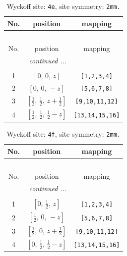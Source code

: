 \documentclass[fleqn,8pt]{jsarticle}
\begin{document}
\begin{longtable}{ccc}
\caption{Wyckoff site: {\tt 4e}, site symmetry: {\tt 2mm.}}
 \\
 \hline \hline
No. & position & mapping \\ \hline \endfirsthead

\multicolumn{2}{l}{\tablename\ \thetable{}} \\
 \hline \hline
No. & position & mapping \\ \hline \endhead

 \hline \hline
\multicolumn{2}{r}{\footnotesize\it continued ...} \\ \endfoot

 \hline \hline
\multicolumn{2}{r}{} \\ \endlastfoot

1 & $\left[ 0,\, 0,\, z \right]$ & {\tt [1,2,3,4]} \\ \hline
2 & $\left[ 0,\, 0,\, - z \right]$ & {\tt [5,6,7,8]} \\ \hline
3 & $\left[ \frac{1}{2},\, \frac{1}{2},\, z + \frac{1}{2} \right]$ & {\tt [9,10,11,12]} \\ \hline
4 & $\left[ \frac{1}{2},\, \frac{1}{2},\, \frac{1}{2} - z \right]$ & {\tt [13,14,15,16]} \\
\end{longtable}
\renewcommand{\arraystretch}{1.2}
\begin{longtable}{ccc}
\caption{Wyckoff site: {\tt 4f}, site symmetry: {\tt 2mm.}}
 \\
 \hline \hline
No. & position & mapping \\ \hline \endfirsthead

\multicolumn{2}{l}{\tablename\ \thetable{}} \\
 \hline \hline
No. & position & mapping \\ \hline \endhead

 \hline \hline
\multicolumn{2}{r}{\footnotesize\it continued ...} \\ \endfoot

 \hline \hline
\multicolumn{2}{r}{} \\ \endlastfoot

1 & $\left[ 0,\, \frac{1}{2},\, z \right]$ & {\tt [1,2,3,4]} \\ \hline
2 & $\left[ \frac{1}{2},\, 0,\, - z \right]$ & {\tt [5,6,7,8]} \\ \hline
3 & $\left[ \frac{1}{2},\, 0,\, z + \frac{1}{2} \right]$ & {\tt [9,10,11,12]} \\ \hline
4 & $\left[ 0,\, \frac{1}{2},\, \frac{1}{2} - z \right]$ & {\tt [13,14,15,16]} \\
\end{longtable}
\end{document}
